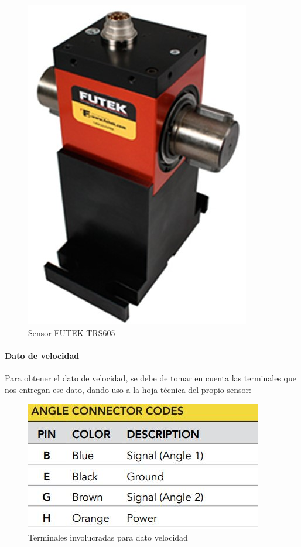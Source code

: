 \documentclass[12pt,titlepage]{article}
\begin{document}
\begin{figure}[htbp]
\hspace*{5.5cm} 
\includegraphics[scale=0.55]{TRS605}
\caption{Sensor FUTEK TRS605}
\end{figure}
\newpage
\paragraph{Dato de velocidad}\leavevmode\newline

Para obtener el dato de velocidad, se debe de tomar en cuenta las terminales que nos entregan ese dato, dando uso a la hoja técnica del propio sensor: \\

\begin{figure}[htbp]
\hspace*{5.2cm} 
\includegraphics[scale=0.58]{dato_velocidad_pin}
\caption{Terminales involucradas para dato velocidad}
\end{figure}
\end{document}
